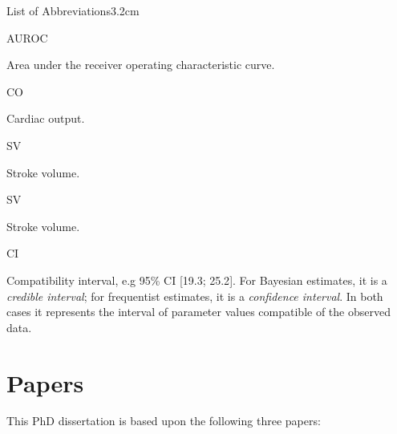 \documentclass[a4paper, nobind]{templates/ociamthesis}
\begin{document}
\begin{romanpages}
\listoffigures
	\mtcaddchapter

\begin{mclistof}{List of Abbreviations}{3.2cm}

\item[AUROC]

Area under the receiver operating characteristic curve.

\item[CO]

Cardiac output.

\item[SV]

Stroke volume.

\item[SV]

Stroke volume.

\item[CI]

Compatibility interval, e.g 95\% CI {[}19.3; 25.2{]}. For Bayesian estimates, it is a \emph{credible interval}; for frequentist estimates, it is a \emph{confidence interval}. In both cases it represents the interval of parameter values compatible of the observed data.

\end{mclistof} 


\end{romanpages}

\flushbottom

\hypertarget{papers}{%
\chapter*{Papers}\label{papers}}

\adjustmtc
{}

This PhD dissertation is based upon the following three papers:
\end{document}
